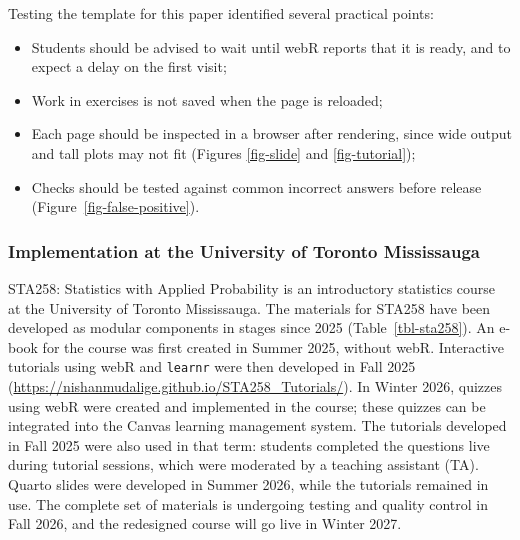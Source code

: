 \documentclass[
  12pt]{article}
\providecommand{\tightlist}{%
  \setlength{\itemsep}{0pt}\setlength{\parskip}{0pt}}
\begin{document}
Testing the template for this paper identified several practical points:

\begin{itemize}
\tightlist
\item
  Students should be advised to wait until webR reports that it is
  ready, and to expect a delay on the first visit;
\item
  Work in exercises is not saved when the page is reloaded;
\item
  Each page should be inspected in a browser after rendering, since wide
  output and tall plots may not fit (Figures \ref{fig-slide} and
  \ref{fig-tutorial});
\item
  Checks should be tested against common incorrect answers before
  release (Figure~\ref{fig-false-positive}).
\end{itemize}

\subsubsection{Implementation at the University of Toronto
Mississauga}\label{implementation-at-the-university-of-toronto-mississauga}

STA258: Statistics with Applied Probability is an introductory
statistics course at the University of Toronto Mississauga. The
materials for STA258 have been developed as modular components in stages
since 2025 (Table~\ref{tbl-sta258}). An e-book for the course was first
created in Summer 2025, without webR. Interactive tutorials using webR
and \texttt{learnr} were then developed in Fall 2025
(\url{https://nishanmudalige.github.io/STA258_Tutorials/}). In Winter
2026, quizzes using webR were created and implemented in the course;
these quizzes can be integrated into the Canvas learning management
system. The tutorials developed in Fall 2025 were also used in that
term: students completed the questions live during tutorial sessions,
which were moderated by a teaching assistant (TA). Quarto slides were
developed in Summer 2026, while the tutorials remained in use. The
complete set of materials is undergoing testing and quality control in
Fall 2026, and the redesigned course will go live in Winter 2027.
\end{document}
